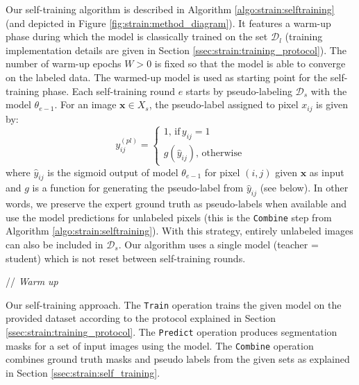 Our self-training algorithm is described in Algorithm \ref{algo:strain:selftraining} (and depicted in Figure \ref{fig:strain:method_diagram}). It features a warm-up phase during which the model is classically trained on the set $\mathcal{D}_l$ (training implementation details are given in Section \ref{ssec:strain:training_protocol}). The number of warm-up epochs $W > 0$ is fixed so that the model is able to converge on the labeled data. The warmed-up model is used as starting point for the self-training phase. Each self-training round $e$ starts by pseudo-labeling $\mathcal{D}_s$ with the model $\theta_{e-1}$. For an image $\mathbf{x} \in X_s$, the pseudo-label assigned to pixel $x_{ij}$ is given by:
\begin{equation}
y^{({pl})}_{ij} = \begin{cases}
1,\,\text{if}\, y_{ij} = 1 \\
g(\hat{y}_{ij}),\,\text{otherwise}
\end{cases}
\label{eqn:strain:pseudolabeling}
\end{equation}
where $\hat{y}_{ij}$ is the sigmoid output of model $\theta_{e-1}$ for pixel $(i, j)$ given $\mathbf{x}$ as input and $g$ is a function for generating the pseudo-label from $\hat{y}_{ij}$ (see below). In other words, we preserve the expert ground truth as pseudo-labels when available and use the model predictions for unlabeled pixels (this is the \texttt{Combine} step from Algorithm \ref{algo:strain:selftraining}). With this strategy, entirely unlabeled images can also be included in $\mathcal{D}_s$. Our algorithm uses a single model (\ie teacher = student) which is not reset between self-training rounds. 

\begin{algorithm}[t]
  \SetAlgoLined
  // \textit{Warm up}  \\
  \caption{Our self-training approach. The \texttt{Train} operation trains the given model on the provided dataset according to the protocol explained in Section \ref{ssec:strain:training_protocol}. The \texttt{Predict} operation produces segmentation masks for a set of input images using the model. The \texttt{Combine} operation combines ground truth masks and pseudo labels from the given sets as explained in Section \ref{ssec:strain:self_training}.}
  \label{algo:strain:selftraining}
\end{algorithm}

